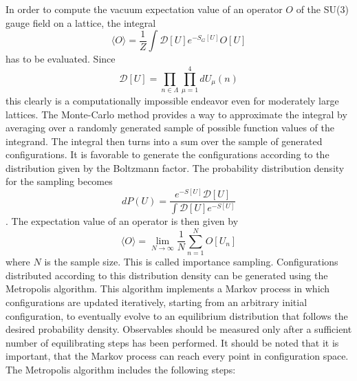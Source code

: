 \documentclass[graybox]{svmult}
\begin{document}
In order to compute the vacuum expectation value of an operator $O$ of the SU(3) gauge field on a lattice, the integral
\begin{equation}
\langle O \rangle = \frac 1 Z \int \mathcal{D}[U] e^{-S_G[U]} O[U]
\end{equation}
has to be evaluated. Since
\begin{equation}
\mathcal{D}[U] = \prod_{n \in \Lambda} \prod_{\mu = 1}^4 dU_{\mu}(n)
\end{equation}
this clearly is a computationally impossible endeavor even for moderately large lattices. The Monte-Carlo method provides a way to approximate the integral by averaging over a randomly generated sample of possible function values of the integrand. The integral then turns into a sum over the sample of generated configurations. It is favorable to generate the configurations according to the distribution given by the Boltzmann factor. The probability distribution density for the sampling becomes
\begin{equation}
dP(U) = \frac{e^{-S[U]}\mathcal{D}[U]}{\int \mathcal{D}[U] e^{-S[U]}}
\end{equation}.
The expectation value of an operator is then given by
\begin{equation}
\langle O \rangle = \lim_{N \rightarrow \infty} \frac{1}{N} \sum_{n = 1}^N O[U_n]
\end{equation}
where $N$ is the sample size. This is called importance sampling.
Configurations distributed according to this distribution density can be generated using the Metropolis algorithm. This algorithm implements a Markov process in which configurations are updated iteratively, starting from an arbitrary initial configuration, to eventually evolve to an equilibrium distribution that follows the desired probability density. Observables should be measured only after a sufficient number of equilibrating steps has been performed. It should be noted that it is important, that the Markov process can reach every point in configuration space. The Metropolis algorithm includes the following steps:
\end{document}
